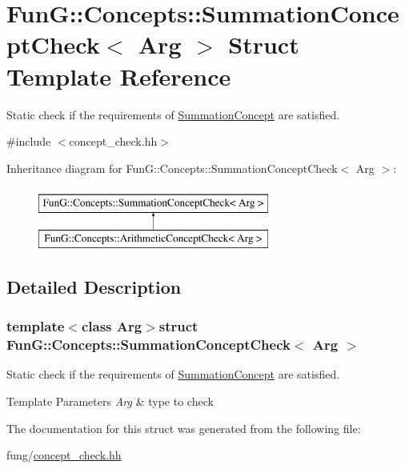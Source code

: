 \hypertarget{structFunG_1_1Concepts_1_1SummationConceptCheck}{}\section{Fun\+G\+:\+:Concepts\+:\+:Summation\+Concept\+Check$<$ Arg $>$ Struct Template Reference}
\label{structFunG_1_1Concepts_1_1SummationConceptCheck}


Static check if the requirements of \hyperlink{structFunG_1_1Concepts_1_1SummationConcept}{Summation\+Concept} are satisfied.  




{\ttfamily \#include $<$concept\+\_\+check.\+hh$>$}

Inheritance diagram for Fun\+G\+:\+:Concepts\+:\+:Summation\+Concept\+Check$<$ Arg $>$\+:\begin{figure}[H]
\begin{center}
\leavevmode
\includegraphics[height=2.000000cm]{structFunG_1_1Concepts_1_1SummationConceptCheck}
\end{center}
\end{figure}


\subsection{Detailed Description}
\subsubsection*{template$<$class Arg$>$struct Fun\+G\+::\+Concepts\+::\+Summation\+Concept\+Check$<$ Arg $>$}

Static check if the requirements of \hyperlink{structFunG_1_1Concepts_1_1SummationConcept}{Summation\+Concept} are satisfied. 


\begin{DoxyTemplParams}{Template Parameters}
{\em Arg} & type to check \\
\hline
\end{DoxyTemplParams}


The documentation for this struct was generated from the following file\+:\begin{DoxyCompactItemize}
\item 
fung/\hyperlink{concept__check_8hh}{concept\+\_\+check.\+hh}\end{DoxyCompactItemize}
